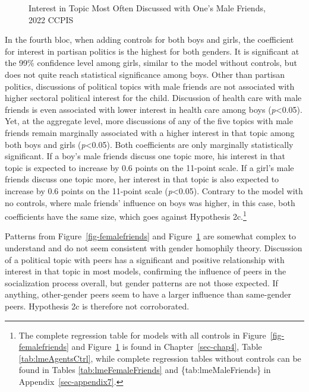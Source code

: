\documentclass[
  letterpaper,
  DIV=11,
  numbers=noendperiod]{scrreprt}
\begin{document}
\begin{figure}


\caption{\label{fig-malefriends}Interest in Topic Most Often Discussed
with One's Male Friends, 2022 CCPIS}

\end{figure}%

In the fourth bloc, when adding controls for both boys and girls, the
coefficient for interest in partisan politics is the highest for both
genders. It is significant at the 99\% confidence level among girls,
similar to the model without controls, but does not quite reach
statistical significance among boys. Other than partisan politics,
discussions of political topics with male friends are not associated
with higher sectoral political interest for the child. Discussion of
health care with male friends is even associated with lower interest in
health care among boys (\emph{p}\textless0.05). Yet, at the aggregate
level, more discussions of any of the five topics with male friends
remain marginally associated with a higher interest in that topic among
both boys and girls (\emph{p}\textless0.05). Both coefficients are only
marginally statistically significant. If a boy's male friends discuss
one topic more, his interest in that topic is expected to increase by
0.6 points on the 11-point scale. If a girl's male friends discuss one
topic more, her interest in that topic is also expected to increase by
0.6 points on the 11-point scale (\emph{p}\textless0.05). Contrary to
the model with no controls, where male friends' influence on boys was
higher, in this case, both coefficients have the same size, which goes
against Hypothesis 2c.\footnote{The complete regression table for models
  with all controls in Figure~\ref{fig-femalefriends} and
  Figure~\ref{fig-malefriends} is found in Chapter~\ref{sec-chap4},
  Table \ref{tab:lmeAgentsCtrl}, while complete regression tables
  without controls can be found in Tables \ref{tab:lmeFemaleFriends} and
  \{tab:lmeMaleFriends\} in Appendix~\ref{sec-appendix7}.}

Patterns from Figure~\ref{fig-femalefriends} and
Figure~\ref{fig-malefriends} are somewhat complex to understand and do
not seem consistent with gender homophily theory. Discussion of a
political topic with peers has a significant and positive relationship
with interest in that topic in most models, confirming the influence of
peers in the socialization process overall, but gender patterns are not
those expected. If anything, other-gender peers seem to have a larger
influence than same-gender peers. Hypothesis 2c is therefore not
corroborated.
\end{document}
